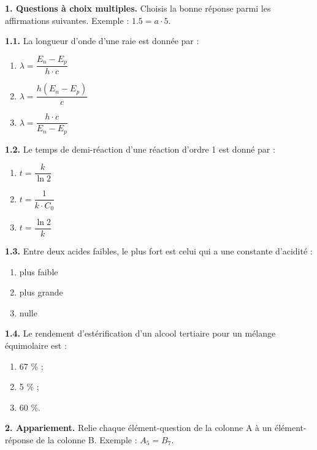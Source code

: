 \documentclass[11pt]{article}
\begin{document}



\noindent\textbf{1. Questions à choix multiples.} Choisis la bonne réponse parmi les affirmations suivantes. Exemple : $1.5 = a\cdot5$.

\noindent\textbf{1.1.} La longueur d'onde d'une raie est donnée par :
\begin{enumerate}[label=$a\cdot$\arabic*.]
  \item $\lambda = \dfrac{E_n - E_p}{h\cdot c}$
  \item $\lambda = \dfrac{h(E_n - E_p)}{c}$
  \item $\lambda = \dfrac{h\cdot c}{E_n - E_p}$
\end{enumerate}

\noindent\textbf{1.2.} Le temps de demi-réaction d'une réaction d'ordre 1 est donné par :
\begin{enumerate}[label=$b\cdot$\arabic*.]
  \item $t = \dfrac{k}{\ln 2}$
  \item $t = \dfrac{1}{k\cdot C_0}$
  \item $t = \dfrac{\ln 2}{k}$
\end{enumerate}

\noindent\textbf{1.3.} Entre deux acides faibles, le plus fort est celui qui a une constante d'acidité :
\begin{enumerate}[label=$c\cdot$\arabic*.]
  \item plus faible
  \item plus grande
  \item nulle
\end{enumerate}

\noindent\textbf{1.4.} Le rendement d'estérification d'un alcool tertiaire pour un mélange équimolaire est :
\begin{enumerate}[label=$d\cdot$\arabic*.]
  \item 67 \% ;
  \item 5 \% ;
  \item 60 \%.
\end{enumerate}

\medskip
\noindent\textbf{2. Appariement.} Relie chaque élément-question de la colonne A à un élément-réponse de la colonne B. Exemple : $A_5 = B_7$.
\end{document}
